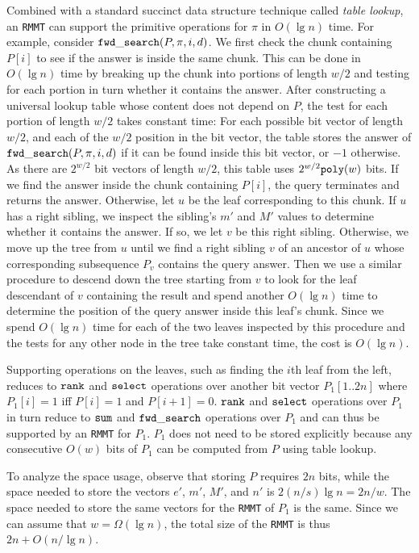 %
Combined with a standard succinct data structure technique called {\em
  table lookup}, an {\tt RMMT} can support the primitive operations
for $\pi$ in $O(\lg n)$ time.  For example, consider
$\mathtt{fwd\_search}(P,\pi,i,d)$.  We first check the chunk containing $P[i]$
to see if the answer is inside the same chunk.  This can be done in
$O(\lg n)$ time by breaking up the chunk into portions of length $w/2$
and testing for each portion in turn whether it contains the answer.
After constructing a universal lookup table whose content does not
depend on $P$, the test for each portion of length $w/2$ takes
constant time: For each possible bit vector of length $w/2$, and each
of the $w/2$ position in the bit vector, the table stores the answer
of $\mathtt{fwd\_search}(P,\pi,i,d)$ if it can be found inside this bit vector,
or $-1$ otherwise.  As there are $2^{w/2}$ bit vectors of length
$w/2$, this table uses $2^{w/2}\mathtt{poly}(w)$ bits.  If we find the answer
inside the chunk containing $P[i]$, the query terminates and returns
the answer.  Otherwise, let $u$ be the leaf corresponding to this
chunk.  If $u$ has a right sibling, we inspect the sibling's $m'$ and
$M'$ values to determine whether it contains the answer.  If so, we
let $v$ be this right sibling.  Otherwise, we move up the tree from
$u$ until we find a right sibling $v$ of an ancestor of $u$ whose
corresponding subsequence $P_v$ contains the query answer.  Then we
use a similar procedure to descend down the tree starting from $v$ to
look for the leaf descendant of $v$ containing the result and spend
another $O(\lg n)$ time to determine the position of the query answer
inside this leaf's chunk.  Since we spend $O(\lg n)$ time for each of
the two leaves inspected by this procedure and the tests for any other
node in the tree take constant time, the cost is $O(\lg n)$.

Supporting operations on the leaves, such as finding the $i$th leaf
from the left, reduces to $\mathtt{rank}$ and $\mathtt{select}$ operations over
another bit vector $P_1[1..2n]$ where $P_1[i] = 1$ iff $P[i] = 1$ and
$P[i+1] = 0$.  $\mathtt{rank}$ and $\mathtt{select}$ operations over $P_1$ in turn
reduce to $\mathtt{sum}$ and $\mathtt{fwd\_search}$ operations over $P_1$ and can thus
be supported by an {\tt RMMT} for $P_1$.  $P_1$ does not need to be
stored explicitly because any consecutive $O(w)$ bits of $P_1$ can be
computed from $P$ using table lookup.

To analyze the space usage, observe that storing $P$ requires $2n$
bits, while the space needed to store the vectors $e'$, $m'$, $M'$,
and $n'$ is $2(n/s) \lg n = 2n/w$.  The space needed to store the same
vectors for the {\tt RMMT} of $P_1$ is the same.  Since we can assume
that $w = \Omega(\lg n)$, the total size of the {\tt RMMT} is thus
$2n + O(n / \lg n)$.
